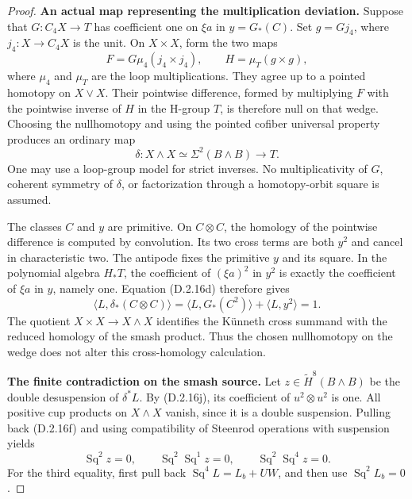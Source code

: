 \begin{proof}
\medskip\noindent
\textbf{An actual map representing the multiplication deviation.}
Suppose that $G:C_4X\to T$ has coefficient one on $\xi a$
in $y=G_*(C)$. Set $g=Gj_4$, where
$j_4:X\to C_4X$ is the unit. On $X\times X$, form the two maps
\[
 F=G\mu_4(j_4\times j_4),\qquad
 H=\mu_T(g\times g),
 \tag{D.2.16h}
\]
where $\mu_4$ and $\mu_T$ are the loop multiplications.
They agree up to a pointed homotopy on $X\vee X$.
Their pointwise difference, formed by multiplying $F$ with the
pointwise inverse of $H$ in the H-group $T$, is therefore null
on that wedge. Choosing the nullhomotopy and using the pointed
cofiber universal property produces an ordinary map
\[
 \delta:X\wedge X\simeq\Sigma^2(B\wedge B)\longrightarrow T.
 \tag{D.2.16i}
\]
One may use a loop-group model for strict inverses. No
multiplicativity of $G$, coherent symmetry of $\delta$, or
factorization through a homotopy-orbit square is assumed.

The classes $C$ and $y$ are primitive. On $C\otimes C$, the homology of
the pointwise difference is computed by convolution. Its two
cross terms are both $y^2$ and cancel in characteristic two.
The antipode fixes the primitive $y$ and its square. In the
polynomial algebra $H_*T$, the coefficient of $(\xi a)^2$
in $y^2$ is exactly the coefficient of $\xi a$ in $y$, namely one.
Equation \textup{(D.2.16d)} therefore gives
\[
 \langle L,\delta_*(C\otimes C)\rangle
  =\langle L,G_*(C^2)\rangle+\langle L,y^2\rangle=1.
 \tag{D.2.16j}
\]
The quotient $X\times X\to X\wedge X$ identifies the K\"unneth
cross summand with the reduced homology of the smash product.
Thus the chosen nullhomotopy on the wedge does not alter this
cross-homology calculation.

\medskip\noindent
\textbf{The finite contradiction on the smash source.}
Let $z\in\widetilde H^8(B\wedge B)$ be the double desuspension
of $\delta^*L$. By \textup{(D.2.16j)}, its coefficient of
$u^2\otimes u^2$ is one. All positive cup products on
$X\wedge X$ vanish, since it is a double suspension.
Pulling back \textup{(D.2.16f)} and using compatibility of
Steenrod operations with suspension yields
\[
 \operatorname{Sq}^2z=0,\qquad
 \operatorname{Sq}^2\operatorname{Sq}^1z=0,\qquad
 \operatorname{Sq}^2\operatorname{Sq}^4z=0.
 \tag{D.2.16k}
\]
For the third equality, first pull back
$\operatorname{Sq}^4L=L_b+UW$, and then use
$\operatorname{Sq}^2L_b=0$.


\end{proof}
